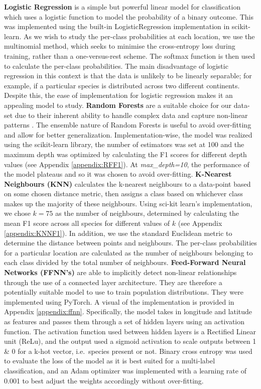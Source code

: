 \textbf{Logistic Regression} is a simple but powerful linear model for classification which uses a logistic function to model the probability of a binary outcome. This was implemented using the built-in LogisticRegression implementation in scikit-learn. As we wish to study the per-class probabilities at each location, we use the multinomial method, which seeks to minimise the cross-entropy loss during training, rather than a one-versus-rest scheme. The softmax function is then used to calculate the per-class probabilities. The main disadvantage of logistic regression in this context is that the data is unlikely to be linearly separable; for example, if a particular species is distributed across two different continents. Despite this, the ease of implementation for logistic regression makes it an appealing model to study.
\textbf{Random Forests} are a suitable choice for our data-set due to their inherent ability to handle complex data and capture non-linear patterns \cite{breiman2001random}. The ensemble nature of Random Forests is useful to avoid over-fitting and allow for better generalization. Implementation-wise, the model was realized using the scikit-learn library, the number of estimators was set at 100 and the maximum depth was optimized by calculating the F1 scores for different depth values (see Appendix \ref{appendix:RFF1}). At \textit{max\_depth=10}, the performance of the model plateaus and so it was chosen to avoid over-fitting.
\textbf{K-Nearest Neighbours (KNN)} calculates the k-nearest neighbours to a data-point based on some chosen distance metric, then assigns a class based on whichever class makes up the majority of these neighbours. Using sci-kit learn's implementation, we chose $k = 75$ as the number of neighbours, determined by calculating the mean F1 score across all species for different values of $k$ (see Appendix \ref{appendix:KNNF1}). In addition, we use the standard Euclidean metric to determine the distance between points and neighbours. The per-class probabilities for a particular location are calculated as the number of neighbours belonging to each class divided by the total number of neighbours. %
\textbf{Feed-Forward Neural Networks (FFNN's)} are able to implicitly detect non-linear relationships through the use of a connected layer architecture. They are therefore a potentially suitable model to use to train population distributions. They were implemented using PyTorch. A visual of the implementation is provided in Appendix \ref{appendix:ffnn}.
Specifically, the model takes in longitude and latitude as features and passes them through a set of hidden layers using an activation function. The activation function used between hidden layers is a Rectified Linear unit (ReLu), and the output used a sigmoid activation to scale outputs between 1 \& 0 for a k-hot vector, i.e.\ species present or not.
Binary cross entropy was used to evaluate the loss of the model as it is best suited for a multi-label classification, and an Adam optimizer was implemented with a learning rate of 0.001 to best adjust the weights accordingly without over-fitting.


